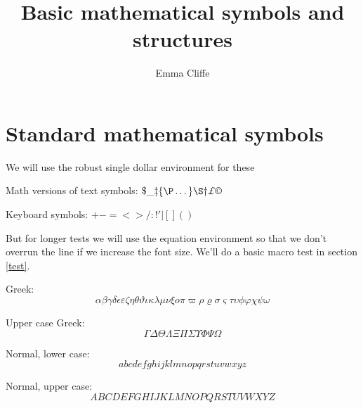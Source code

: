 


\title{Basic mathematical symbols and structures}
\author{Emma Cliffe}
\date{}
\usepackage{demacro-private}

\maketitle
\tableofcontents
{}

\section{Standard mathematical symbols}

We will use the robust single dollar environment for these

Math versions of text symbols: \(\$  \_  \ddag  \{  \P  \dots  \}  \S  \dag  \pounds \copyright\)

Keyboard symbols: \(+  -  =  <  >  /  :  !  '  |  [  ]  (  )\)

\noindent 
But for longer tests we will use the equation environment so that we don't overrun the line if we increase the font size. We'll do a basic macro test in section \ref{test}.

Greek:
\begin{equation}
\alpha  \beta  \gamma  \delta  \epsilon  \varepsilon  \zeta  \eta  \theta  \vartheta  \iota  \kappa  \lambda  \mu  \nu  \xi  o  \pi  \varpi  \rho  \varrho  \sigma  \varsigma  \tau  \upsilon  \phi  \varphi  \chi  \psi  \omega
\end{equation}%

Upper case Greek:
\begin{equation}
\Gamma  \Delta  \Theta  \Lambda  \Xi  \Pi  \Sigma  \Upsilon  \Phi  \Psi  \Omega
\end{equation}

Normal, lower case:
\begin{equation}
a  b  c  d  e  f  g  h  i  j  k  l  m  n  o  p  q  r  s  t  u  v  w  x  y  z
\end{equation}

Normal, upper case:
\begin{equation}
A  B  C  D  E  F  G  H  I  J  K  L  M  N  O  P  Q  R  S  T  U  V  W  X  Y  Z  
\end{equation}

